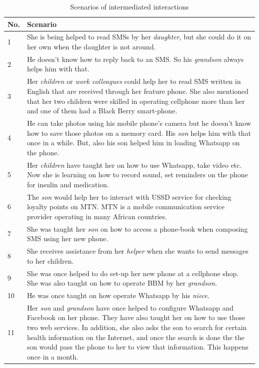 \begin{table}[h!]
  \begin{center}
    \caption{Scenarios of intermediated interactions}
    \label{table:intermediated}
	\begin{tabular}{|p{1cm}|p{12cm}|}
		\hline
		 \textbf{No.}&\textbf{Scenario}\\
		\hline
		 1& She is being helped to read SMSs by her \emph{daughter}, but she could do it on her own when the daughter is not around. \\
		\hline
		2&He doesn’t know how to reply back to an SMS. So his \emph{grandson} always helps him with that.\\
	\hline
	  3&Her \emph{children} or  \emph{work colleagues} could help her to read SMS written in English that are received through her feature phone. She also mentioned that her two children were skilled in operating cellphone more than her and one of them had a Black Berry smart-phone.\\
	  \hline
	  4&He can take photos using his mobile phone’s camera but he doesn't know how to save those photos on a memory card. His \emph{son} helps him with that once in a while. But, also his son helped him in loading Whatsapp on the phone.\\
	  \hline
	  5&Her \emph{children} have taught her on how to use Whatsapp, take video etc. Now she is learning on how to record sound, set reminders on the phone for insulin and medication.\\
	 \hline
	 6&The \emph{son} would help her to interact with USSD service for checking loyalty points on MTN. MTN is a mobile communication service provider operating in many African countries.\\
	 \hline
	7&She was taught her \emph{son} on how to access a phone-book when composing SMS using her new phone.\\
	\hline
	8&She receives assistance from her \emph{helper} when she wants to send messages to her children.\\
	\hline
	9&She was once helped to do set-up her new phone at a cellphone shop. She was also taught on how to operate BBM by her \emph{grandson}.\\
	\hline
	10& He was once taught on how operate Whatsapp by his \emph{niece}.\\
	\hline
	11&Her \emph{son} and \emph{grandson} have once helped to configure Whatsapp and Facebook on her phone. They have also taught her on how to use those two web services. In addition, she also asks the son to search for certain health information on the Internet, and once the search is done the the son would pass the phone to her to view that information. This happens once in a month.\\

\end{tabular}
\end{center}
\end{table}
